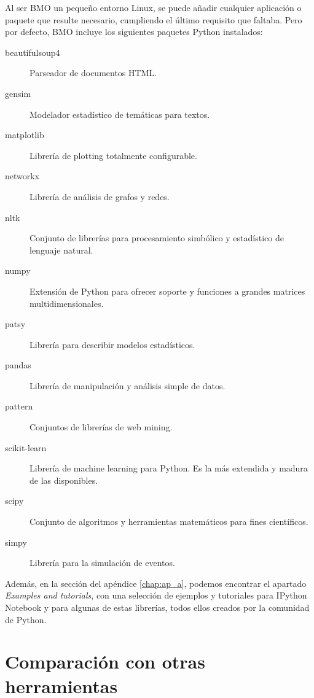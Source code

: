 Al ser BMO un pequeño entorno Linux, se puede añadir cualquier aplicación o paquete que resulte necesario, cumpliendo el último requisito que faltaba. Pero por defecto, BMO incluye los siguientes paquetes Python instalados:

\begin{description}
\item[beautifulsoup4] Parseador de documentos HTML.

\item[gensim] Modelador estadístico de temáticas para textos.

\item[matplotlib] Librería de plotting totalmente configurable.

\item[networkx] Librería de análisis de grafos y redes.

\item[nltk] Conjunto de librerías para procesamiento simbólico y estadístico de lenguaje natural.

\item[numpy] Extensión de Python para ofrecer soporte y funciones a grandes matrices multidimensionales.

\item[patsy] Librería para describir modelos estadísticos.

\item[pandas] Librería de manipulación y análisis simple de datos.

\item[pattern] Conjuntos de librerías de web mining.

\item[scikit-learn] Librería de machine learning para Python. Es la más extendida y madura de las disponibles.

\item[scipy] Conjunto de algoritmos y herramientas matemáticos para fines científicos.

\item[simpy] Librería para la simulación de eventos.
\end{description}

Además, en la sección  del apéndice \ref{chap:ap_a}, podemos encontrar el apartado \emph{Examples and tutorials}, con una selección de ejemplos y tutoriales para IPython Notebook y para algunas de estas librerías, todos ellos creados por la comunidad de Python.

\section{Comparación con otras herramientas} \label{sec:4.5}

